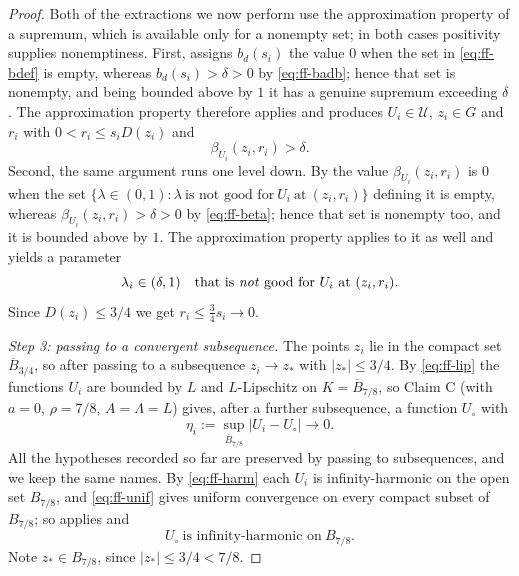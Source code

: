 \begin{proof}
Both of the extractions we now perform use the approximation property of a
supremum, which is available only for a nonempty set; in both cases positivity
supplies nonemptiness. First,  assigns $b_d(s_i)$ the
value $0$ when the set in \eqref{eq:ff-bdef} is empty, whereas
$b_d(s_i)>\delta>0$ by \eqref{eq:ff-badb}; hence that set is nonempty, and being
bounded above by $1$ it has a genuine supremum exceeding $\delta$. The
approximation property therefore applies and produces $U_i\in\mathcal U$,
$z_i\in G$ and $r_i$ with $0<r_i\le s_iD(z_i)$ and
\begin{equation}\label{eq:ff-beta}
  \beta_{U_i}(z_i,r_i)>\delta .
\end{equation}
Second, the same argument runs one level down. By  the
value $\beta_{U_i}(z_i,r_i)$ is $0$ when the set
$\{\lambda\in(0,1):\lambda\ \text{is not good for}\ U_i\ \text{at}\ (z_i,r_i)\}$
defining it is empty, whereas $\beta_{U_i}(z_i,r_i)>\delta>0$ by
\eqref{eq:ff-beta}; hence that set is nonempty too, and it is bounded above by
$1$. The approximation property applies to it as well and yields a parameter
\begin{equation}\label{eq:ff-lam}
  \lambda_i\in(\delta,1)\quad\text{that is \emph{not} good for }U_i
  \text{ at }(z_i,r_i).
\end{equation}
Since $D(z_i)\le3/4$ we get $r_i\le\tfrac34s_i\to0$.

\emph{Step 3: passing to a convergent subsequence.}
The points $z_i$ lie in the compact set $\overline B_{3/4}$, so after passing to
a subsequence $z_i\to z_*$ with $|z_*|\le3/4$. By \eqref{eq:ff-lip} the
functions $U_i$ are bounded by $L$ and $L$-Lipschitz on
$K=\overline B_{7/8}$, so Claim C (with $a=0$, $\rho=7/8$, $A=\Lambda=L$) gives,
after a further subsequence, a function $U_\circ$ with
\begin{equation}\label{eq:ff-unif}
  \eta_i:=\sup_{\overline B_{7/8}}|U_i-U_\circ|\longrightarrow0 .
\end{equation}
All the hypotheses recorded so far are preserved by passing to subsequences, and
we keep the same names. By \eqref{eq:ff-harm} each $U_i$ is infinity-harmonic on
the open set $B_{7/8}$, and \eqref{eq:ff-unif} gives uniform convergence on every
compact subset of $B_{7/8}$; so  applies and
\begin{equation}\label{eq:ff-limharm}
  U_\circ\ \text{is infinity-harmonic on}\ B_{7/8}.
\end{equation}
Note $z_*\in B_{7/8}$, since $|z_*|\le3/4<7/8$.


\end{proof}
